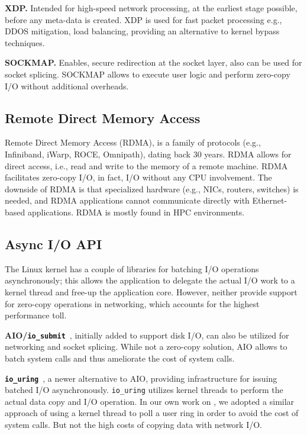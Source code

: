\noindent \textbf{XDP\cite{xdp}.} Intended for high-speed network processing, at the earliest stage possible, before any meta-data is created. XDP is used for fast packet processing e.g., DDOS mitigation, load balancing, providing an alternative to kernel bypass techniques. 


\noindent \textbf{SOCKMAP\cite{sockmap}.} Enables, secure redirection at the socket layer, also can be used for socket splicing\cite{cloudflare_sockmap}. SOCKMAP allows to execute user logic and perform zero-copy I/O without additional overheads.

\subsection{Remote Direct Memory Access}
Remote Direct Memory Access (RDMA), is a family of protocols (e.g., Infiniband\cite{infiniband}, iWarp\cite{iwarp}, ROCE\cite{roce}, Omnipath\cite{omnipath}), dating back 30 years. RDMA allows for direct access, i.e., read and write to the memory of a remote machine. RDMA facilitates zero-copy I/O, in fact, I/O without any CPU involvement. The downside of RDMA is that specialized hardware (e.g., NICs, routers, switches) is needed, and RDMA applications cannot communicate directly with Ethernet-based applications. RDMA is mostly found in HPC environments\cite{top500}.

\subsection{Async I/O API}
The Linux kernel has a couple of libraries for batching I/O operations asynchronously; this allows the application to delegate the actual I/O work to a kernel thread and free-up the application core.
However, neither provide support for zero-copy operations in networking, which accounts for the highest performance toll.

\noindent \textbf{AIO/\texttt{io\_submit}}~\cite{aio}, initially added to support disk I/O, can also be utilized for networking and socket splicing\cite{cloudflare_aio}. While not a zero-copy solution, AIO allows to batch system calls and thus ameliorate the cost of system calls.

\noindent \textbf{\texttt{io\_uring}}~\cite{io-uring}, a newer alternative to AIO, providing infrastructure for issuing batched I/O asynchronously. \texttt{io\_uring} utilizes kernel threads to perform the actual data copy and I/O operation. In our own work on \oursys, we adopted a similar approach of using a kernel thread to poll a user ring in order to avoid the cost of system calls. But not the high costs of copying data with network I/O.

